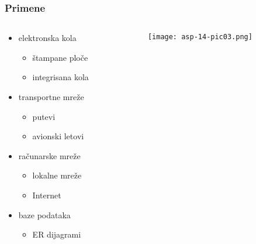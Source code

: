 \documentclass[compress,aspectratio=169]{beamer}
\begin{document}
\begin{frame}[fragile]
  \frametitle{Primene}
  \begin{columns}
    \begin{column}[t]{6cm}
      \begin{itemize}
        \item elektronska kola
        \begin{itemize}
          \item štampane ploče
          \item integrisana kola
        \end{itemize}
        \item transportne mreže
        \begin{itemize}
          \item putevi
          \item avionski letovi
        \end{itemize}
        \item računarske mreže
        \begin{itemize}
          \item lokalne mreže
          \item Internet
        \end{itemize}
        \item baze podataka
        \begin{itemize}
          \item ER dijagrami
        \end{itemize}
      \end{itemize}
    \end{column}
    \begin{column}[t]{6cm}
      \begin{center}
        \texttt{[image: asp-14-pic03.png]}
      \end{center}
    \end{column}
  \end{columns}
\end{frame}
\end{document}
